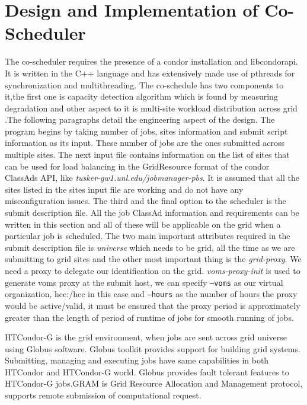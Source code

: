 \documentclass[ms,electronic,double]{nuthesis}
\begin{document}
\chapter{Design and Implementation of Co-Scheduler}
The co-scheduler requires the presence of a condor installation and libcondorapi.
It is written in the C++ language and has extensively made use of pthreads for 
synchronization and multithreading. The co-schedule has two components to it,the first one is capacity detection
algorithm which is found by measuring degradation and other aspect to it is 
multi-site workload distribution across grid .The following  paragraphs detail the 
engineering aspect of the design.
The program begins by taking number of jobs, sites information and submit script 
information as its input. These number of jobs are the ones submitted across 
multiple sites. The next input file contains information on the list of sites that can be used 
for load balancing in the GridResource format of the condor ClassAds API, like \emph{tusker-gw1.unl.edu/jobmanager-pbs}.
It is assumed that all the sites listed in the sites input file are working and 
do not have any misconfiguration issues. The third and the final option to the 
scheduler is the submit description file. All the job ClassAd information and 
requirements can be written in this section and all of these will be applicable on the grid when a particular job is 
scheduled. The two main important attributes required in the submit description 
file is \emph{universe} which needs to be grid, all the time as we are submitting 
to grid sites and the other most important thing is the 
\emph{grid-proxy}. We need a proxy to delegate our identification on the grid. \emph{voms-proxy-init}
is used to generate voms proxy at the submit host, we can specify \texttt{--voms} as our 
virtual organization, hcc:/hcc in this case and \texttt{--hours} as the number of hours the proxy would be 
active/valid, it must be ensured that the proxy period is approximately greater than the 
length of period of runtime of jobs for smooth running of jobs.

HTCondor-G is the grid environment, when jobs are sent across grid universe using 
Globus software. Globus toolkit provides support for building grid systems. 
Submitting, managing and executing jobs have same capabilities in both HTCondor 
and HTCondor-G world. Globus provides fault tolerant features to HTCondor-G 
jobs.GRAM is Grid Resource Allocation and Management protocol, supports remote 
submission of computational request.
\end{document}
